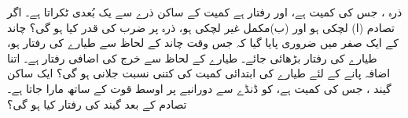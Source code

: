 ذرہ ، جس کی کمیت  ہے، اور رفتار  ہے   کمیت کے ساکن ذرے  سے یک بُعدی ٹکراتا ہے۔  اگر تصادم (ا)  لچکی ہو اور (ب)مکمل   غیر لچکی ہو،  ذرہ  پر ضرب کی قدر کیا ہو گی؟
چاند کے   ایک صفر میں ضروری پایا گیا    کہ جس وقت چاند کے لحاظ سے طیارے کی رفتار  ہو،  طیارے کی رفتار  بڑھائی جائے۔ طیارے کے لحاظ سے خرج کی اضافی رفتار  ہے۔ اتنا اضافہ پانے کے لئے طیارے کی  ابتدائی کمیت کی کتنی نسبت جلانی ہو گی؟
ایک ساکن  گیند ، جس کی کمیت  ہے، کو ڈنڈے سے  دورانیے پر   اوسط  قوت کے ساتھ  مارا جاتا ہے۔تصادم کے بعد گیند کی رفتار کیا ہو گی؟

